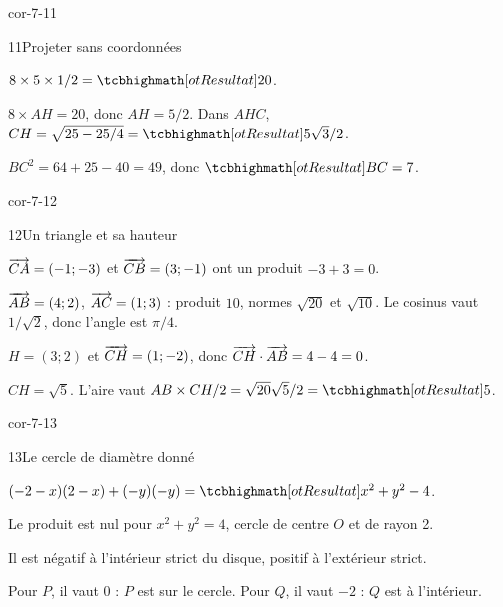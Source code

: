 \begin{blocLivre}{cor-7-11}
\begin{corrige}{11}{Projeter sans coordonnées}
\begin{questions}
\item $8\times5\times1/2=\res{20}$.
\item $8\times AH=20$, donc $AH=5/2$. Dans $AHC$, $CH=\sqrt{25-25/4}=\res{5\sqrt3/2}$.
\item $BC^2=64+25-40=49$, donc $\res{BC=7}$.
\end{questions}

\label{figgeo-07-11-cor}
\end{corrige}
\end{blocLivre}
\begin{blocLivre}{cor-7-12}
\begin{corrige}{12}{Un triangle et sa hauteur}
\begin{questions}
\item $\overrightarrow{CA}=(-1;-3)$ et $\overrightarrow{CB}=(3;-1)$ ont un produit $-3+3=0$.
\item $\overrightarrow{AB}=(4;2)$, $\overrightarrow{AC}=(1;3)$ : produit $10$, normes $\sqrt{20}$ et $\sqrt{10}$. Le cosinus vaut $1/\sqrt2$, donc l’angle est $\pi/4$.
\item $H=(3;2)$ et $\overrightarrow{CH}=(1;-2)$, donc $\overrightarrow{CH}\cdot\overrightarrow{AB}=4-4=0$.
\item $CH=\sqrt5$. L’aire vaut $AB\times CH/2=\sqrt{20}\sqrt5/2=\res{5}$.
\end{questions}

\label{figgeo-07-12-cor}
\end{corrige}
\end{blocLivre}
\begin{blocLivre}{cor-7-13}
\begin{corrige}{13}{Le cercle de diamètre donné}
\begin{questions}
\item $(-2-x)(2-x)+(-y)(-y)=\res{x^2+y^2-4}$.
\item Le produit est nul pour $x^2+y^2=4$, cercle de centre $O$ et de rayon 2.
\item Il est négatif à l’intérieur strict du disque, positif à l’extérieur strict.
\item Pour $P$, il vaut 0 : $P$ est sur le cercle. Pour $Q$, il vaut $-2$ : $Q$ est à l’intérieur.
\end{questions}

\label{figgeo-07-13-cor}
\end{corrige}
\end{blocLivre}
